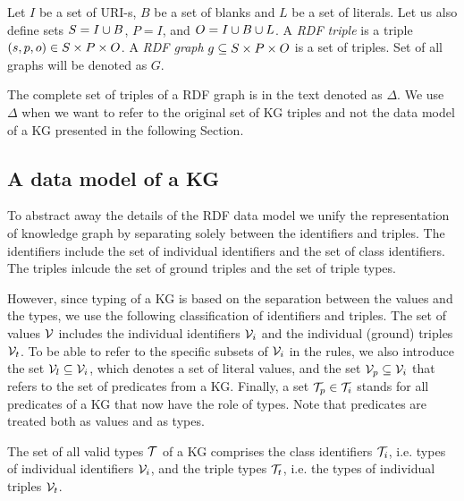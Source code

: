 \documentclass[runningheads]{llncs}
\newcommand{\I}{{\cal I}}
\newcommand{\V}{{\cal V}}
\newcommand{\T}{{\cal T}}
\begin{document}
Let $I$ be a set of URI-s, $B$ be a set of blanks and $L$ be a set of
literals. Let us also define sets $S = I\cup\/B$, $P = I$, and
$O = I\cup\/B\cup\/L$. A \emph{RDF triple} is a triple
$(s,p,o)\in\/S\times\/P\times\/O$. A \emph{RDF graph}
$g\subseteq\/S\times\/P\times\/O$ is a set of triples. Set of all
graphs will be denoted as $G$.

The complete set of triples of a RDF graph is in the text denoted as
$\Delta$. We use $\Delta$ when we want to refer to the original set of
KG triples and not the data model of a KG presented in the following
Section.






\subsection{A data model of a KG}

To abstract away the details of the RDF data model we unify the
representation of knowledge graph by separating solely between the
identifiers and triples. The identifiers include the set of individual
identifiers and the set of class identifiers. The triples inlcude the
set of ground triples and the set of triple types.


However, since typing of a KG is based on the separation between the
values and the types, we use the following classification of
identifiers and triples. The set of values $\V$ includes the
individual identifiers $\V_i$ and the individual (ground) triples
$\V_t$. To be able to refer to the specific subsets of $\V_i$ in the
rules, we also introduce the set $\V_l\subseteq\V_i$, which denotes a
set of literal values, and the set $\V_p\subseteq\V_i$ that refers to
the set of predicates from a KG. Finally, a set $\T_p\in\T_i$ stands
for all predicates of a KG that now have the role of types. Note that
predicates are treated both as values and as types.

The set of all valid types $\T$ of a KG comprises the class
identifiers $\T_i$, i.e. types of individual identifiers $\V_i$, and
the triple types $\T_t$, i.e. the types of individual triples $\V_t$.
\end{document}
